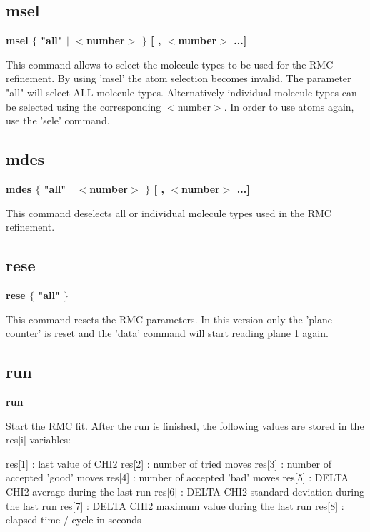 \subsection*{msel}
{\bf msel $ \{$ "all" $| $ $ <$number$> $ $\} $ [ , $ <$number$> $ ...] \par }
\par
\vspace{3pt}
This command allows to select the molecule types to be used for 
the RMC refinement. By using 'msel' the atom selection becomes 
invalid. The parameter "all" will select ALL molecule types. 
Alternatively individual molecule types can be selected using the 
corresponding $ <$number$> $. In order to use atoms again, use the 'sele' 
command. 
\subsection*{mdes}
{\bf mdes $ \{$ "all" $| $ $ <$number$> $ $\} $ [ , $ <$number$> $ ...] \par }
\par
\vspace{3pt}
This command deselects all or individual molecule types used in 
the RMC refinement. 
\subsection*{rese}
{\bf rese $ \{$ "all" $\} $ \par }
\par
\vspace{3pt}
This command resets the RMC parameters. In this version only the 
'plane counter' is reset and the 'data' command will start reading 
plane 1 again. 
\subsection*{run}
{\bf run \par }
\par
\vspace{3pt}
Start the RMC fit. After the run is finished, the following values 
are stored in the res[i] variables: 
\par
\begin{MacVerbatim}
res[1] : last value of CHI2
res[2] : number of tried moves
res[3] : number of accepted 'good' moves
res[4] : number of accepted 'bad' moves
res[5] : DELTA CHI2 average during the last run
res[6] : DELTA CHI2 standard deviation during the last run
res[7] : DELTA CHI2 maximum value during the last run
res[8] : elapsed time / cycle in seconds
\end{MacVerbatim}
